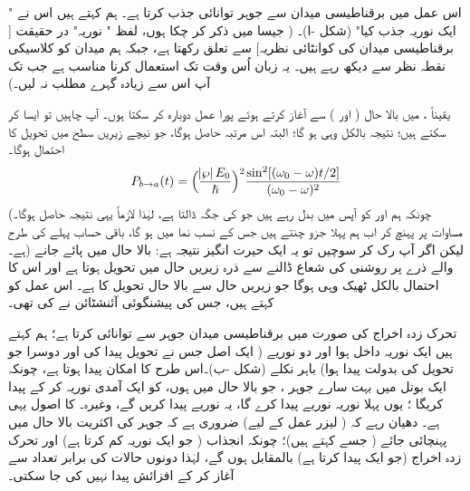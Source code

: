اس عمل میں برقناطیسی میدان سے جوہر  توانائی جذب کرتا ہے۔ ہم کہتے ہیں اس نے " ایک نوریہ جذب کیا"  (شکل -ا)۔ (  جیسا میں ذکر کر چکا ہوں،  لفظ " نوریہ"  در حقیقت [  برقناطیسی میدان کی کوانٹائی نظریہ]  سے تعلق رکھتا ہے،  جبکہ ہم میدان کو کلاسیکی نقطہ نظر سے دیکھ رہے ہیں۔ یہ زبان اُس وقت تک استعمال کرنا مناسب ہے جب تک آپ اس سے زیادہ گہرے  مطلب نہ لیں۔)

یقیناً ، میں بالا حال (  اور   )   سے آغاز کرتے ہوئے پورا عمل دوبارہ کر سکتا ہوں۔ آپ  چاہیں تو ایسا کر سکتے ہیں؛  نتیجہ  بالکل وہی ہو گا؛  البتہ اس
 مرتبہ   حاصل ہوگا،  جو نیچے  زیریں سطح  میں تحویل  کا احتمال ہوگا۔
\begin{align}\label{مساوات_تابع_مضطرب_تحویلی_احتمال_سعت}
	P_{b\to a} (t) = \Big(\frac{\abs{\wp}E_0}{\hslash}\Big)^2 \frac{\sin^2[(\omega_0 - \omega)t/2]}{(\omega_0 - \omega)^2}
\end{align}
(چونکہ ہم  اور   کو آپس میں بدل      رہے ہیں جو  کی جگہ  ڈالتا ہے،  لہٰذا لازماً یہی نتیجہ حاصل ہوگا۔ مساوات   پر  پہنچ کر اب  ہم پہلا جزو  چنتے ہیں جس کے نسب نما میں  ہو گا، باقی حساب پہلے کی طرح ہے۔) لیکن اگر آپ  رک کر سوچیں تو یہ  ایک  حیرت انگیز  نتیجہ ہے:  بالا حال میں پائے جانے والے ذرے پر روشنی کی شعاع ڈالنے سے ذرہ زیریں حال میں  تحویل  ہوتا ہے اور اس کا احتمال بالکل ٹھیک وہی ہوگا جو زیریں حال سے بالا حال تحویل  کا ہے۔ اس عمل کو   کہتے ہیں،  جس کی پیشنگوئی آئنشٹائن نے کی   تھی۔

تحرک زدہ اخراج کی صورت میں برقناطیسی میدان   جوہر سے    توانائی  کرتا ہے؛ ہم کہتے ہیں ایک نوریہ داخل ہوا اور دو نوریے (  ایک اصل جس نے تحویل  پیدا کی اور دوسرا جو تحویل کی بدولت پیدا  ہوا)  باہر نکلے   (شکل -ب)۔اس طرح     کا امکان پیدا ہوتا ہے،  چونکہ  ایک بوتل میں بہت سارے جوہر ، جو  بالا حال میں ہوں، کو ایک آمدی نوریہ   کر کے    پیدا کریگا ؛ یوں پہلا نوریہ  نوریے پیدا کرے گا، یہ نوریے  پیدا کریں گے، وغیرہ۔  کا   اصول   یہی    ہے۔   دھیان رہے کہ ( لیزر عمل کے لیے)  ضروری ہے کہ جوہر کی   اکثریت  بالا حال میں پہنچائی  جائے (  جسے    کہتے ہیں)؛   چونکہ انجذاب (  جو  ایک نوریہ کم کرتا ہے) اور تحرک زدہ  اخراج  (جو ایک پیدا کرتا ہے)  بالمقابل ہوں گے،  لہٰذا دونوں حالات کی برابر تعداد سے آغاز کر کے  افزائش  پیدا نہیں کی جا سکتی۔ 

